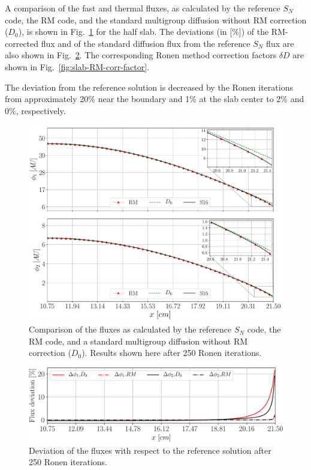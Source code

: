 A comparison of the fast and thermal fluxes, as calculated by the reference $S_N$ code, the RM code, and the standard multigroup diffusion without RM correction ($D_0$), is shown in Fig.~\ref{fig:slab-fluxes} for the half slab. The deviations (in [\%]) of the RM-corrected flux and of the standard diffusion flux from the reference $S_N$ flux are also shown in Fig.~\ref{fig:slab-fluxes-dev}. The corresponding Ronen method correction factors $\delta D$ are shown in Fig.~\ref{fig:slab-RM-corr-factor}.

The deviation from the reference solution is decreased by the Ronen iterations from approximately 20\% near the boundary and 1\% at the slab center to 2\% and 0\%, respectively. 


\begin{figure}[htbp]
	\centering
	\includegraphics[width=0.7\linewidth]{Sn_Diff_Rm_flux_Tomatis2011.pdf}
	\caption{Comparison of the fluxes as calculated by the reference $S_N$ code, the RM code, and a standard multigroup diffusion without RM correction ($D_0$). Results shown here after 250 Ronen iterations.}
	\label{fig:slab-fluxes}		
\end{figure}

\begin{figure}[htbp]
	\centering
	\includegraphics[width=0.65\linewidth]{flx_err_Tomatis2011_400_250.pdf}
	\caption{Deviation of the fluxes with respect to the reference solution after 250 Ronen iterations.}
	\label{fig:slab-fluxes-dev}
\end{figure}

